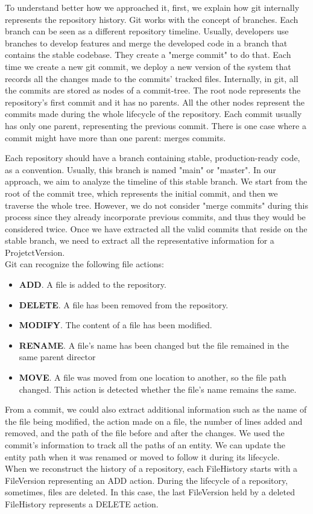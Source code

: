 To understand better how we approached it, first, we explain how git internally represents the repository history. 
Git works with the concept of branches. Each branch can be seen as a different repository timeline.
Usually, developers use branches to develop features and merge the developed code in a branch that contains the stable codebase.
They create a "merge commit" to do that. 
Each time we create a new git commit, we deploy a new version of the system that records all the changes made to the commits' tracked files. 
Internally, in git, all the commits are stored as nodes of a commit-tree. 
The root node represents the repository's first commit and it has no parents. 
All the other nodes represent the commits made during the whole lifecycle of the repository. 
Each commit usually has only one parent, representing the previous commit.
There is one case where a commit might have more than one parent: merges commits.

Each repository should have a branch containing stable, production-ready code, as a convention. Usually, this branch is named "main" or "master". 
In our approach, we aim to analyze the timeline of this stable branch. We start from the root of the commit tree, which represents the initial commit, and then we traverse the whole tree. 
However, we do not consider "merge commits" during this process since they already incorporate previous commits, and thus they would be considered twice. 
Once we have extracted all the valid commits that reside on the stable branch, we need to extract all the representative information for a ProjetctVersion. \\

Git can recognize the following file actions:
\begin{itemize}
    \item \textbf{ADD}. A file is added to the repository.
    \item \textbf{DELETE}. A file has been removed from the repository.
    \item \textbf{MODIFY}. The content of a file has been modified.
    \item \textbf{RENAME}. A file's name has been changed but the file remained in the same parent director
    \item \textbf{MOVE}. A file was moved from one location to another, so the file path changed. This action is detected whether the file's name remains the same. 
\end{itemize}

From a commit, we could also extract additional information such as the name of the file being modified, the action made on a file, the number of lines added and removed, and the path of the file before and after the changes.
We used the commit's information to track all the paths of an entity. We can update the entity path when it was renamed or moved to follow it during its lifecycle. \\
When we reconstruct the history of a repository, each FileHistory starts with a FileVersion representing an ADD action.
During the lifecycle of a repository, sometimes, files are deleted. In this case, the last FileVersion held by a deleted FileHistory represents a DELETE action.

